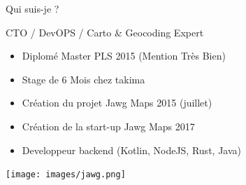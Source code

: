 \begin{frame}{Qui suis-je ?}

\begin{block}{CTO / DevOPS / Carto \& Geocoding Expert}
  \begin{itemize}
    \item Diplomé Master PLS 2015 (Mention Très Bien)
    \item Stage de 6 Mois chez takima
    \item Création du projet Jawg Maps 2015 (juillet)
    \item Création de la start-up Jawg Maps 2017
    \item Developpeur backend (Kotlin, NodeJS, Rust, Java)
  \end{itemize}
  \centering
  \begin{minipage}{0.33\paperwidth}
    \texttt{[image: images/jawg.png]}
  \end{minipage}
\end{block}

\end{frame}

